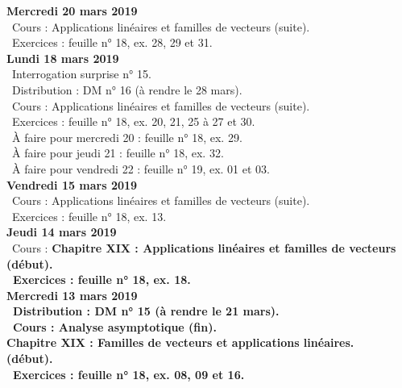\documentclass[12pt,a4paper]{article}
\begin{document}
\noindent\textbf{Mercredi 20 mars 2019} \\
\bu\ Cours : Applications linéaires et familles de vecteurs (suite).\\
\bu\ Exercices : feuille n° 18, ex. 28, 29 et 31.\vspace{.4cm}\\

\noindent\textbf{\bf Lundi 18 mars 2019} \\
\bu\ Interrogation surprise n° 15.\\
\bu\ Distribution : DM n° 16 (à rendre le 28 mars).\\
\bu\ Cours : Applications linéaires et familles de vecteurs (suite).\\
\bu\ Exercices : feuille n° 18, ex. 20, 21, 25 à 27 et 30.\\
\bu\ À faire pour mercredi 20 : feuille n° 18, ex. 29.\\
\bu\ À faire pour jeudi 21 : feuille n° 18, ex. 32.\\
\bu\ À faire pour vendredi 22 : feuille n° 19, ex. 01 et 03.\vspace{.4cm}\\

\noindent\textbf{\bf Vendredi 15 mars 2019} \\
\bu\ Cours : Applications linéaires et familles de vecteurs (suite).\\
\bu\ Exercices : feuille n° 18, ex. 13.\vspace{.4cm}\\

\noindent\textbf{Jeudi 14 mars 2019}\\
\bu\ Cours : \bf Chapitre XIX \rm : Applications linéaires et familles de vecteurs (début).\\
\bu\ Exercices : feuille n° 18, ex. 18.\vspace{.4cm}\\

\noindent\textbf{Mercredi 13 mars 2019} \\
\bu\ Distribution : DM n° 15 (à rendre le 21 mars).\\
\bu\ Cours : Analyse asymptotique (fin).\\
\bf Chapitre XIX \rm : Familles de vecteurs et applications linéaires.\\ 
(début).\\
\bu\ Exercices : feuille n° 18, ex. 08, 09 et 16.\vspace{.4cm}\\
\end{document}
